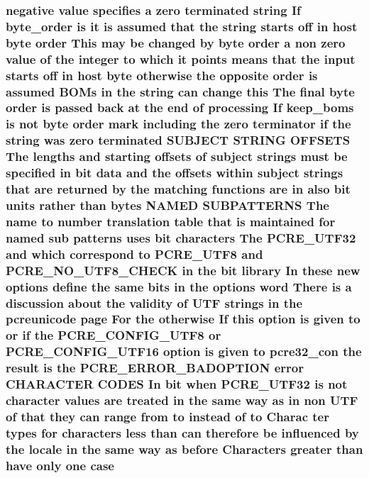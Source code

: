 \subsubsection[{\texorpdfstring{case}{case}}]{ negative {\bf value} specifies {\bf a} {\bf zero} terminated {\bf string} If byte\+\_\+order {\bf is} {\bf it} {\bf is} assumed that the {\bf string} starts off {\bf in} {\bf host} byte {\bf order} This may {\bf be} changed by byte {\bf order} {\bf a} non {\bf zero} {\bf value} {\bf of} the integer {\bf to} {\bf which} {\bf it} points means that the {\bf input} starts off {\bf in} {\bf host} byte otherwise the opposite {\bf order} {\bf is} assumed B\+O\+Ms {\bf in} the {\bf string} {\bf can} change {\bf this} The final byte {\bf order} {\bf is} passed back at the {\bf end} {\bf of} processing If keep\+\_\+boms {\bf is} {\bf not} byte {\bf order} {\bf mark} including the {\bf zero} terminator {\bf if} the {\bf string} was {\bf zero} terminated S\+U\+B\+J\+E\+CT {\bf S\+T\+R\+I\+NG} O\+F\+F\+S\+E\+TS The lengths and starting {\bf offsets} {\bf of} subject {\bf strings} must {\bf be} {\bf specified} {\bf in} {\bf bit} {\bf data} and the {\bf offsets} within subject {\bf strings} that {\bf are} returned by the {\bf matching} {\bf functions} {\bf are} {\bf in} also {\bf bit} {\bf units} rather {\bf than} {\bf bytes} N\+A\+M\+ED S\+U\+B\+P\+A\+T\+T\+E\+R\+NS The {\bf name} {\bf to} {\bf number} translation {\bf table} that {\bf is} maintained for named sub {\bf patterns} uses {\bf bit} {\bf characters} The {\bf P\+C\+R\+E\+\_\+\+U\+T\+F32} and {\bf which} correspond {\bf to} {\bf P\+C\+R\+E\+\_\+\+U\+T\+F8} and {\bf P\+C\+R\+E\+\_\+\+N\+O\+\_\+\+U\+T\+F8\+\_\+\+C\+H\+E\+CK} {\bf in} the {\bf bit} {\bf library} In these new {\bf options} define the same bits {\bf in} the {\bf options} {\bf word} There {\bf is} {\bf a} discussion about the validity {\bf of} U\+TF {\bf strings} {\bf in} the pcreunicode page For the otherwise If {\bf this} {\bf option} {\bf is} {\bf given} {\bf to} {\bf or} {\bf if} the {\bf P\+C\+R\+E\+\_\+\+C\+O\+N\+F\+I\+G\+\_\+\+U\+T\+F8} {\bf or} {\bf P\+C\+R\+E\+\_\+\+C\+O\+N\+F\+I\+G\+\_\+\+U\+T\+F16} {\bf option} {\bf is} {\bf given} {\bf to} pcre32\+\_\+con the {\bf result} {\bf is} the {\bf P\+C\+R\+E\+\_\+\+E\+R\+R\+O\+R\+\_\+\+B\+A\+D\+O\+P\+T\+I\+ON} {\bf error} C\+H\+A\+R\+A\+C\+T\+ER C\+O\+D\+ES In {\bf bit} when {\bf P\+C\+R\+E\+\_\+\+U\+T\+F32} {\bf is} {\bf not} {\bf character} {\bf values} {\bf are} treated {\bf in} the same {\bf way} {\bf as} {\bf in} non U\+TF {\bf of} that they {\bf can} range {\bf from} {\bf to} instead {\bf of} {\bf to} Charac ter {\bf types} for {\bf characters} less {\bf than} {\bf can} {\bf therefore} {\bf be} influenced by the {\bf locale} {\bf in} the same {\bf way} {\bf as} before Characters greater {\bf than} have only one case}\hypertarget{README_8txt_a61cbca597de2fa81dbf0e4145bac6972}{}\label{README_8txt_a61cbca597de2fa81dbf0e4145bac6972}
